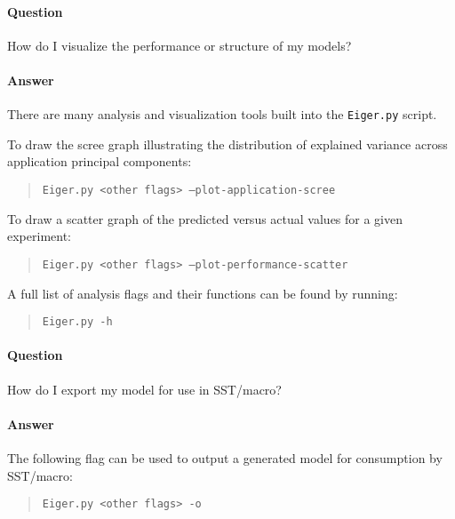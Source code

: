 \paragraph{Question}
How do I visualize the performance or structure of my models?
\paragraph{Answer}
There are many analysis and visualization tools built into the
\texttt{Eiger.py} script.

To draw the scree graph illustrating the distribution of explained variance
across application principal components:

	\begin{quote}
	\texttt{Eiger.py <other flags> --plot-application-scree}
	\end{quote}

To draw a scatter graph of the predicted versus actual values for a given
experiment:

	\begin{quote}
	\texttt{Eiger.py <other flags> --plot-performance-scatter}
	\end{quote}

A full list of analysis flags and their functions can be found by running:

	\begin{quote}
	\texttt{Eiger.py -h}
	\end{quote}

\paragraph{Question}
How do I export my model for use in SST/macro?
\paragraph{Answer}
The following flag can be used to output a generated model for
consumption by SST/macro:

	\begin{quote}
	\texttt{Eiger.py <other flags> -o}
	\end{quote}

